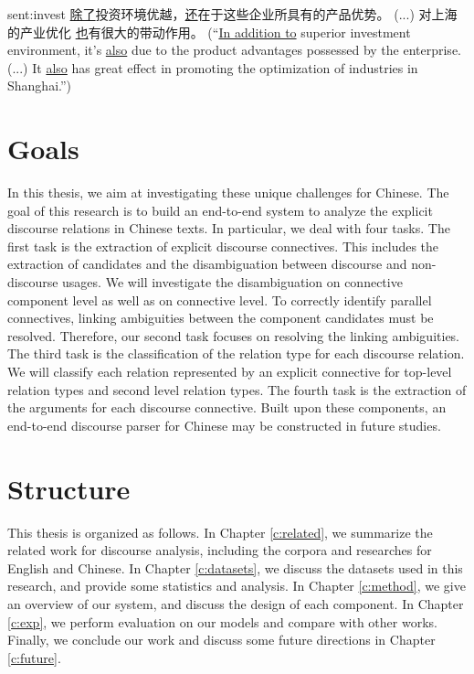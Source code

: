 \begin{sent}{sent:invest}{}
\underline{除了}投资环境优越，\underline{还}在于这些企业所具有的产品优势。
(...) 对上海的产业优化 \underline{也}有很大的带动作用。
(``\underline{In addition to}
superior investment environment, it's \underline{also} due to the product
advantages possessed by the enterprise. (...) It \underline{also} has
great effect in promoting the optimization of industries in Shanghai.'')
\end{sent}



%
%
\section{Goals}

In this thesis, we aim at investigating these unique challenges for Chinese.
The goal of this research is to build an end-to-end system to analyze
the explicit discourse relations in Chinese texts. In particular, we
deal with four tasks. The first task is the extraction of explicit discourse
connectives. This includes the extraction of candidates and the disambiguation
between discourse and non-discourse usages. We will investigate the disambiguation
on connective component level as well as on connective level.
To correctly identify parallel connectives, linking ambiguities between
the component candidates must be resolved. Therefore, our second task
focuses on resolving the linking ambiguities.
The third task is the classification of the relation type for each discourse
relation.
We will classify each relation represented by an explicit connective for top-level
relation types and second level relation types.
The fourth task is the extraction of the arguments for each discourse connective.
Built upon these components, an end-to-end discourse parser for Chinese may
be constructed in future studies.

%
%
\section{Structure}
This thesis is organized as follows. In Chapter \ref{c:related}, we summarize
the related work for discourse analysis, including the corpora and researches for
English and Chinese. In Chapter \ref{c:datasets}, we discuss the datasets used in
this research, and provide some statistics and analysis. In Chapter \ref{c:method},
we give an overview of our system, and discuss the design of each component.
In Chapter \ref{c:exp}, we perform evaluation on our models and compare with
other works. Finally, we conclude our work and discuss some future directions in
Chapter \ref{c:future}.
